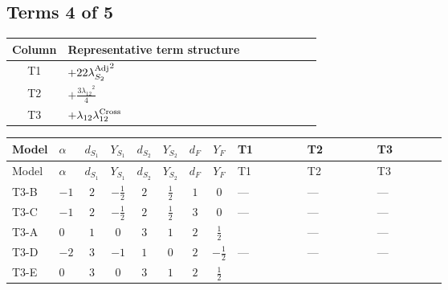 \documentclass[8pt]{article}
\begin{document}
\begin{landscape}
\subsection*{Terms 4 of 5}
\begin{center}
\begin{tabular}{@{}c >{\raggedright\arraybackslash}p{0.82\linewidth}@{}}
\toprule
Column & Representative term structure \\
\midrule
T1 & \(\displaystyle +22 {\lambda_{S_2}^{\rm Adj}}^2\) \\
\midrule
T2 & \(\displaystyle +\frac{3 {\lambda_{12}}^2}{4}\) \\
\midrule
T3 & \(\displaystyle +{\lambda_{12}} {\lambda_{12}^{\rm Cross}}\) \\
\midrule
\bottomrule
\end{tabular}
\end{center}
\smallskip
\tiny
\begin{longtable}{@{}llcccccc >{\raggedright\arraybackslash}p{0.21\linewidth} >{\raggedright\arraybackslash}p{0.21\linewidth} >{\raggedright\arraybackslash}p{0.21\linewidth}@{}}
\toprule
Model & $\alpha$ & $d_{S_1}$ & $Y_{S_1}$ & $d_{S_2}$ & $Y_{S_2}$ & $d_F$ & $Y_F$ & T1 & T2 & T3 \\
\midrule
\endfirsthead
\toprule
Model & $\alpha$ & $d_{S_1}$ & $Y_{S_1}$ & $d_{S_2}$ & $Y_{S_2}$ & $d_F$ & $Y_F$ & T1 & T2 & T3 \\
\midrule
\endhead
T3-B & $-1$ & $2$ & $-\frac{1}{2}$ & $2$ & $\frac{1}{2}$ & $1$ & $0$ & --- & --- & --- \\
\midrule
T3-C & $-1$ & $2$ & $-\frac{1}{2}$ & $2$ & $\frac{1}{2}$ & $3$ & $0$ & --- & --- & --- \\
\midrule
T3-A & $0$ & $1$ & $0$ & $3$ & $1$ & $2$ & $\frac{1}{2}$ & \scriptsize\adjustbox{max width=\linewidth}{$\begin{gathered} +22 {\lambda_{S_2}^{\rm Adj}}^2\end{gathered}$} & --- & --- \\
\midrule
T3-D & $-2$ & $3$ & $-1$ & $1$ & $0$ & $2$ & $-\frac{1}{2}$ & --- & --- & --- \\
\midrule
T3-E & $0$ & $3$ & $0$ & $3$ & $1$ & $2$ & $\frac{1}{2}$ & \scriptsize\adjustbox{max width=\linewidth}{$\begin{gathered} +22 {\lambda_{S_2}^{\rm Adj}}^2\end{gathered}$} & \scriptsize\adjustbox{max width=\linewidth}{$\begin{gathered} +\frac{3 {\lambda_{12}}^2}{4}\end{gathered}$} & \scriptsize\adjustbox{max width=\linewidth}{$\begin{gathered} +{\lambda_{12}} {\lambda_{12}^{\rm Cross}}\end{gathered}$} \\
\midrule
\bottomrule
\end{longtable}
\clearpage

\end{landscape}
\end{document}
